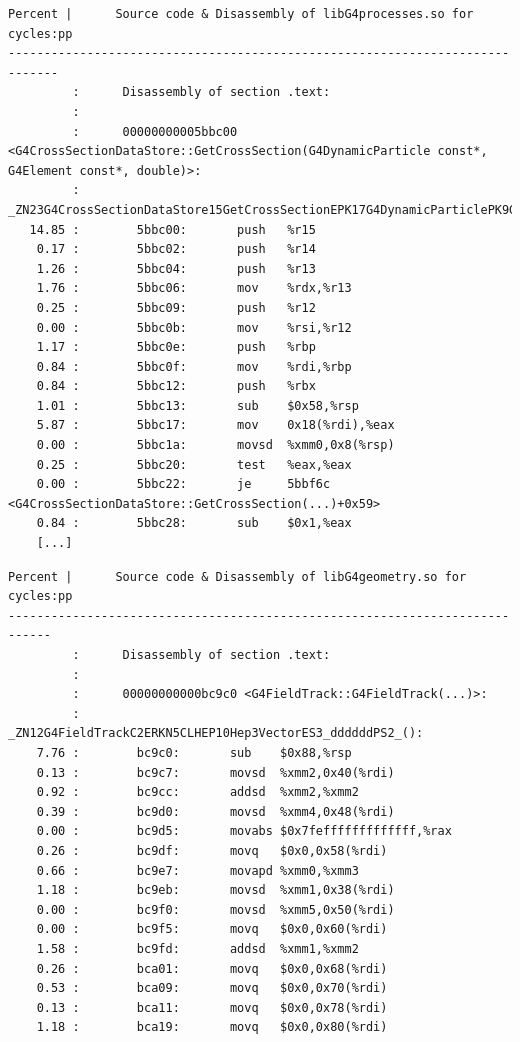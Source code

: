 \documentclass[a4paper]{jpconf}
\begin{document}
\begin{appendices}
\begin{minipage}{\linewidth}
\begin{lstlisting}[language={[x64]Assembler}, basicstyle=\ttfamily\tiny,
caption=G4CrossSectionDataStore::GetCrossSection cycles annotation]
Percent |      Source code & Disassembly of libG4processes.so for  cycles:pp
-----------------------------------------------------------------------------
         :      Disassembly of section .text:
         :
         :      00000000005bbc00 <G4CrossSectionDataStore::GetCrossSection(G4DynamicParticle const*, G4Element const*, double)>:
         :      _ZN23G4CrossSectionDataStore15GetCrossSectionEPK17G4DynamicParticlePK9G4Elementd():
   14.85 :        5bbc00:       push   %r15
    0.17 :        5bbc02:       push   %r14
    1.26 :        5bbc04:       push   %r13
    1.76 :        5bbc06:       mov    %rdx,%r13
    0.25 :        5bbc09:       push   %r12
    0.00 :        5bbc0b:       mov    %rsi,%r12
    1.17 :        5bbc0e:       push   %rbp
    0.84 :        5bbc0f:       mov    %rdi,%rbp
    0.84 :        5bbc12:       push   %rbx
    1.01 :        5bbc13:       sub    $0x58,%rsp
    5.87 :        5bbc17:       mov    0x18(%rdi),%eax
    0.00 :        5bbc1a:       movsd  %xmm0,0x8(%rsp)
    0.25 :        5bbc20:       test   %eax,%eax
    0.00 :        5bbc22:       je     5bbf6c <G4CrossSectionDataStore::GetCrossSection(...)+0x59>
    0.84 :        5bbc28:       sub    $0x1,%eax
    [...]
\end{lstlisting}
\end{minipage}

\begin{minipage}{\linewidth}
\begin{lstlisting}[language={[x64]Assembler}, basicstyle=\ttfamily\tiny, 
caption=G4FieldTrack::G4FieldTrack cycles annotation]
 Percent |      Source code & Disassembly of libG4geometry.so for  cycles:pp
----------------------------------------------------------------------------
         :      Disassembly of section .text:
         :
         :      00000000000bc9c0 <G4FieldTrack::G4FieldTrack(...)>:
         :      _ZN12G4FieldTrackC2ERKN5CLHEP10Hep3VectorES3_ddddddPS2_():
    7.76 :        bc9c0:       sub    $0x88,%rsp
    0.13 :        bc9c7:       movsd  %xmm2,0x40(%rdi)
    0.92 :        bc9cc:       addsd  %xmm2,%xmm2
    0.39 :        bc9d0:       movsd  %xmm4,0x48(%rdi)
    0.00 :        bc9d5:       movabs $0x7fefffffffffffff,%rax
    0.26 :        bc9df:       movq   $0x0,0x58(%rdi)
    0.66 :        bc9e7:       movapd %xmm0,%xmm3
    1.18 :        bc9eb:       movsd  %xmm1,0x38(%rdi)
    0.00 :        bc9f0:       movsd  %xmm5,0x50(%rdi)
    0.00 :        bc9f5:       movq   $0x0,0x60(%rdi)
    1.58 :        bc9fd:       addsd  %xmm1,%xmm2
    0.26 :        bca01:       movq   $0x0,0x68(%rdi)
    0.53 :        bca09:       movq   $0x0,0x70(%rdi)
    0.13 :        bca11:       movq   $0x0,0x78(%rdi)
    1.18 :        bca19:       movq   $0x0,0x80(%rdi)
\end{lstlisting}
\end{minipage}


\end{appendices}
\end{document}
